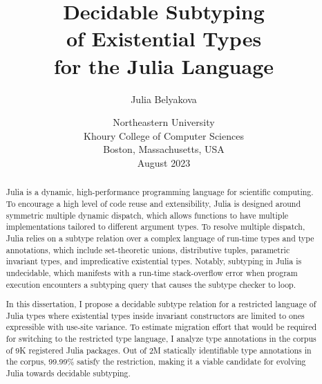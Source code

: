 \title{Decidable Subtyping\\ of Existential Types\\for the Julia Language}

\author{Julia Belyakova}

\date{\normalsize%
Northeastern University\\
Khoury College of Computer Sciences\\
Boston, Massachusetts, USA\\
August 2023
}

\maketitle


\begin{abstract}

Julia is a dynamic, high-performance programming language
for scientific computing.
To encourage a high level of code reuse and extensibility, Julia is
designed around symmetric multiple dynamic dispatch, which allows functions
to have multiple implementations tailored to different argument types.
To resolve multiple dispatch, Julia relies on a subtype relation over a complex
language of run-time types and type annotations, 
which include set-theoretic unions, distributive tuples, parametric invariant 
types, and impredicative existential types.
Notably, subtyping in Julia is undecidable, which
manifests with a run-time stack-overflow error when program execution encounters
a subtyping query that causes the subtype checker to loop.

In this dissertation, I propose a decidable subtype relation for a restricted
language of Julia types where existential types inside invariant constructors
are limited to ones expressible with use-site variance.
To estimate migration effort that would be required for switching to the 
restricted type language, I analyze type annotations in the corpus of 9K
registered Julia packages.
Out of 2M statically identifiable type annotations in the corpus,
99.99\% satisfy the restriction, making it a viable candidate for
evolving Julia towards decidable subtyping.

\end{abstract}
